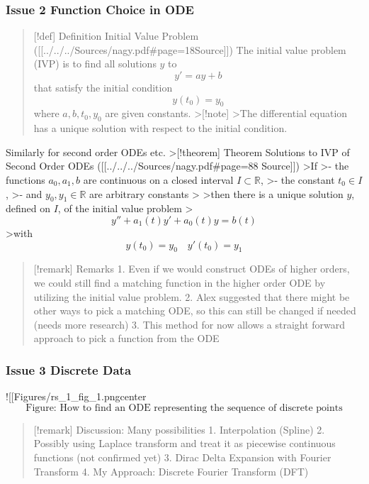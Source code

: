 \documentclass[
]{article}
\begin{document}
\subsubsection{Issue 2 Function Choice in
ODE}\label{issue-2-function-choice-in-ode}

\begin{quote}
{[}!def{]} Definition Initial Value Problem
({[}{[}../../../Sources/nagy.pdf\#page=18\textbar Source{]}{]}) The
initial value problem (IVP) is to find all solutions \(y\) to
\[ y' = ay+b \] that satisfy the initial condition
\[ y(t_0) = y_0 \tag{Initial Condition}\] where \(a,b,t_0, y_0\) are
given constants. \textgreater{[}!note{]} \textgreater The differential
equation has a unique solution with respect to the initial condition.
\end{quote}

Similarly for second order ODEs etc. \textgreater{[}!theorem{]} Theorem
Solutions to IVP of Second Order ODEs
({[}{[}../../../Sources/nagy.pdf\#page=88 \textbar{} Source{]}{]})
\textgreater If \textgreater- the functions \(a_{0},a_{1}, b\) are
continuous on a closed interval \(I \subset \mathbb{R}\), \textgreater-
the constant \(t_{0} \in I\), \textgreater- and
\(y_{0}, y_{1} \in \mathbb{R}\) are arbitrary constants \textgreater{}
\textgreater then there is a unique solution \(y\), defined on \(I\), of
the initial value problem
\textgreater{}\[y'' + a_{1}(t)y'+ a_{0}(t)y = b(t)\] \textgreater with
\[ y(t_{0})=y_{0} \quad y'(t_{0})= y_{1}\]

\begin{quote}
{[}!remark{]} Remarks 1. Even if we would construct ODEs of higher
orders, we could still find a matching function in the higher order ODE
by utilizing the initial value problem. 2. Alex suggested that there
might be other ways to pick a matching ODE, so this can still be changed
if needed (needs more research) 3. This method for now allows a straight
forward approach to pick a function from the ODE
\end{quote}

\subsubsection{Issue 3 Discrete Data}\label{issue-3-discrete-data}

!{[}{[}Figures/rs\_1\_fig\_1.png\textbar center\textbar1000{]}{]}
\[\text{Figure: How to find an ODE representing the sequence of discrete points}\]

\begin{quote}
{[}!remark{]} Discussion: Many possibilities 1. Interpolation (Spline)
2. Possibly using Laplace transform and treat it as piecewise continuous
functions (not confirmed yet) 3. Dirac Delta Expansion with Fourier
Transform 4. My Approach: Discrete Fourier Transform (DFT)
\end{quote}
\end{document}
